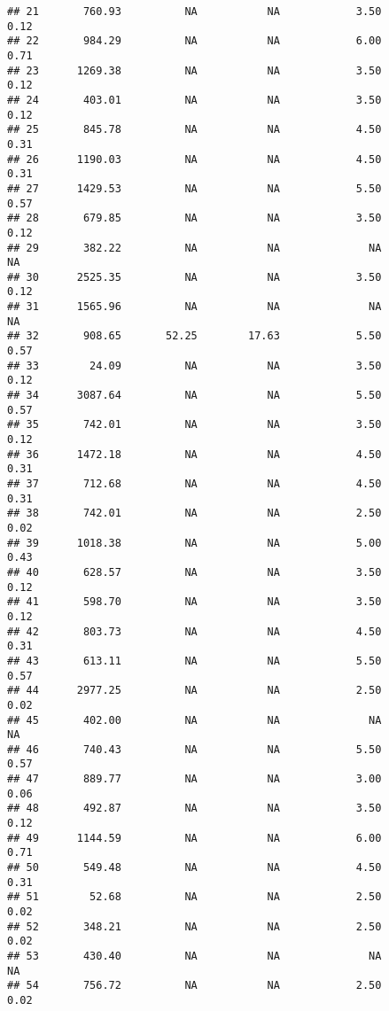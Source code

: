 \documentclass[]{article}
\begin{document}
\begin{verbatim}
## 21       760.93          NA           NA            3.50             0.12
## 22       984.29          NA           NA            6.00             0.71
## 23      1269.38          NA           NA            3.50             0.12
## 24       403.01          NA           NA            3.50             0.12
## 25       845.78          NA           NA            4.50             0.31
## 26      1190.03          NA           NA            4.50             0.31
## 27      1429.53          NA           NA            5.50             0.57
## 28       679.85          NA           NA            3.50             0.12
## 29       382.22          NA           NA              NA               NA
## 30      2525.35          NA           NA            3.50             0.12
## 31      1565.96          NA           NA              NA               NA
## 32       908.65       52.25        17.63            5.50             0.57
## 33        24.09          NA           NA            3.50             0.12
## 34      3087.64          NA           NA            5.50             0.57
## 35       742.01          NA           NA            3.50             0.12
## 36      1472.18          NA           NA            4.50             0.31
## 37       712.68          NA           NA            4.50             0.31
## 38       742.01          NA           NA            2.50             0.02
## 39      1018.38          NA           NA            5.00             0.43
## 40       628.57          NA           NA            3.50             0.12
## 41       598.70          NA           NA            3.50             0.12
## 42       803.73          NA           NA            4.50             0.31
## 43       613.11          NA           NA            5.50             0.57
## 44      2977.25          NA           NA            2.50             0.02
## 45       402.00          NA           NA              NA               NA
## 46       740.43          NA           NA            5.50             0.57
## 47       889.77          NA           NA            3.00             0.06
## 48       492.87          NA           NA            3.50             0.12
## 49      1144.59          NA           NA            6.00             0.71
## 50       549.48          NA           NA            4.50             0.31
## 51        52.68          NA           NA            2.50             0.02
## 52       348.21          NA           NA            2.50             0.02
## 53       430.40          NA           NA              NA               NA
## 54       756.72          NA           NA            2.50             0.02

\end{verbatim}
\end{document}
